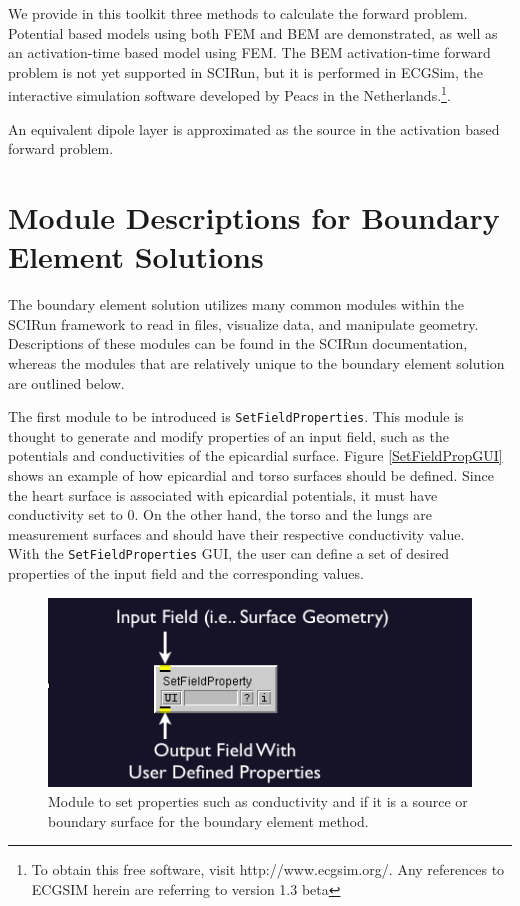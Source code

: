 \documentclass[fleqn,11pt,openany]{book}
\begin{document}
We provide in this toolkit three methods to calculate the forward problem. Potential based models using both FEM and BEM are demonstrated, as well as an activation-time based model using FEM. The BEM activation-time forward problem is not yet supported in SCIRun, but it is performed in ECGSim, the interactive simulation software developed by Peacs in the Netherlands.\footnote{To obtain this free software, visit http://www.ecgsim.org/. Any references to ECGSIM herein are referring to version 1.3 beta}.


An equivalent dipole layer is approximated as the source in the activation based forward problem.


\section{Module Descriptions for Boundary Element Solutions}

The boundary element solution utilizes many common modules within the SCIRun framework
to read in files, visualize data, and manipulate geometry. Descriptions of these modules
can be found in the SCIRun documentation, whereas the modules that are relatively unique to the boundary element solution are outlined below.

The first module to be introduced is {\tt SetFieldProperties}. This module is thought to generate and modify properties of an input field, such as the potentials and conductivities of
the epicardial surface. Figure \ref{SetFieldPropGUI} shows an example of how epicardial and torso surfaces should be defined. Since the heart surface is associated with epicardial potentials,
it must have conductivity set to 0. On the other hand, the torso and the lungs are measurement surfaces and should have their respective conductivity value.\\
With the {\tt SetFieldProperties} GUI, the user can define a set of desired properties of the input field and the corresponding values.

\begin{figure}[H]
\begin{center}
\includegraphics[width=12 cm]{ECGToolkitGuide_figures/SetFieldProps.png}
\caption{Module to set properties such as conductivity and if it is a source or boundary surface for the boundary element method.}
\label{SetFieldProp}
\end{center}
\end{figure}
\end{document}
